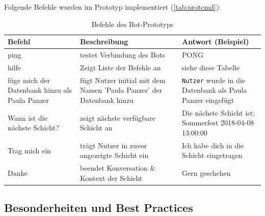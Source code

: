 Folgende Befehle wurden im Prototyp implementiert (\autoref{tab:protcmd}):

\begin{table}[h!]
    \centering
    \begin{tabularx}{\textwidth}{|X|X|X|}
        \hline
        \textbf{Befehl} & \textbf{Beschreibung} & \textbf{Antwort} (Beispiel) \\
        \hline
        ping & testet Verbindung des Bots & PONG \\
        \hline
        hilfe & Zeigt Liste der Befehle an & siehe diese Tabelle \\
        \hline
        füge mich der Datenbank hinzu als Paula Panzer & fügt Nutzer initial mit dem Namen 'Paula Panzer' der Datenbank hinzu & \texttt{Nutzer} wurde in die Datenbank als Paula Panzer eingefügt \\
        \hline
        Wann ist die nächste Schicht? & zeigt nächste verfügbare Schicht an & Die nächste Schicht ist: Sommerfest 2018-04-08 13:00:00 \\
        \hline
        Trag mich ein & trägt Nutzer in zuvor angezeigte Schicht ein & Ich habe dich in die Schicht eingetragen \\
        \hline
        Danke & beendet Konversation \& Kontext der Schicht & Gern geschehen \\
        \hline
    \end{tabularx}
    \caption{Befehle des Bot-Prototyps}
    \label{tab:protcmd}
\end{table}


\subsection{Besonderheiten und Best Practices}

